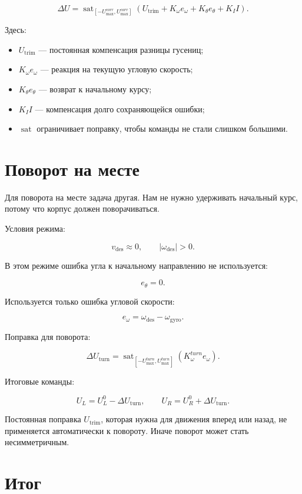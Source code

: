 \documentclass[12pt,a4paper]{article}
\newcommand{\vdes}{v_{\mathrm{des}}}
\newcommand{\wdes}{\omega_{\mathrm{des}}}
\newcommand{\wgyro}{\omega_{\mathrm{gyro}}}
\newcommand{\sat}{\operatorname{sat}}
\begin{document}
\[
\Delta U =
\sat_{[-U_{\max}^{corr},U_{\max}^{corr}]}
\left(
U_{\mathrm{trim}}
+ K_\omega e_\omega
+ K_\theta e_\theta
+ K_I I
\right).
\]

Здесь:

\begin{itemize}
  \item \(U_{\mathrm{trim}}\) --- постоянная компенсация разницы гусениц;
  \item \(K_\omega e_\omega\) --- реакция на текущую угловую скорость;
  \item \(K_\theta e_\theta\) --- возврат к начальному курсу;
  \item \(K_I I\) --- компенсация долго сохраняющейся ошибки;
  \item \(\sat\) ограничивает поправку, чтобы команды не стали слишком
  большими.
\end{itemize}

\section{Поворот на месте}

Для поворота на месте задача другая. Нам не нужно удерживать начальный
курс, потому что корпус должен поворачиваться.

Условия режима:

\[
\vdes \approx 0,
\qquad
|\wdes| > 0.
\]

В этом режиме ошибка угла к начальному направлению не используется:

\[
e_\theta = 0.
\]

Используется только ошибка угловой скорости:

\[
e_\omega = \wdes - \wgyro.
\]

Поправка для поворота:

\[
\Delta U_{\mathrm{turn}} =
\sat_{[-U_{\max}^{turn},U_{\max}^{turn}]}
\left(
K_\omega^{turn} e_\omega
\right).
\]

Итоговые команды:

\[
U_L = U_L^0 - \Delta U_{\mathrm{turn}},
\qquad
U_R = U_R^0 + \Delta U_{\mathrm{turn}}.
\]

Постоянная поправка \(U_{\mathrm{trim}}\), которая нужна для движения
вперед или назад, не применяется автоматически к повороту. Иначе поворот
может стать несимметричным.

\section{Итог}
\end{document}
